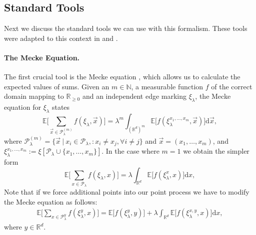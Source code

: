 \documentclass[a4paper,12pt]{scrartcl}
\newcommand{\E}{\mathbb{E}}
\renewcommand{\d}{\mathrm{d}}
\newcommand{\nats}{\mathbb{N}}
\newcommand{\reals}{\mathbb{R}}
\newcommand{\set}[2]{\big\{ #1 \mid #2 \big\}}
\theoremstyle{definition}
\theoremstyle{remark}
\begin{document}

\subsection{Standard Tools}\label{ssec:standard_tools}

Next we discuss the standard tools we can use with this formalism. These tools were adapted to this context in \cite{LastZiescheStationary} and \cite{lace_exp_mean}.

\paragraph{The Mecke Equation.}\label{par:mecke}
The first crucial tool
is the Mecke equation
\cite{lace_exp_mean}, which allows us to calculate the expected values of sums. %
Given an $m\in\nats$, a measurable function $f$ of the correct domain mapping to $\reals_{\geq0}$
and an independent edge marking $\xi_\lambda$, the Mecke equation for $\xi_\lambda$ states
$$
\E\bigg[
  \sum_{\vec x\in\mathcal P_{\lambda}^{(m)}}
f(\xi_\lambda, \vec x)\bigg]
=
\lambda^m \int_{(\reals^d)^m}
\E\bigg[
f(\xi_{\lambda}^{x_1,\dots, x_m}, \vec x)\bigg]
\d\vec x,
$$
where $\mathcal P_\lambda^{(m)}=\{\vec x\ |\ x_i\in\mathcal P_\lambda, :x_i\neq x_j,\forall i\neq j\}$ and $\vec x=(x_1,\dots,x_m)$,
and $\xi_\lambda^{x_1,\ldots,x_m}
:= \xi [ \mathcal P_\lambda \cup \{x_1,\ldots,x_m\}]$.
In the case where $m=1$ we obtain the simpler form
$$
\E\bigg[
  \sum_{ x\in\mathcal P_{\lambda}}
f(\xi_{\lambda}, x)\bigg]
=
\lambda\int_{\reals^d}
\E\bigg[
f(\xi_{\lambda}^{x}, x)\bigg]
\d x,
$$
Note that if we force additional points into our point process we have to modify the Mecke equation as follows:
\begin{align*}
  \E\bigg[
    \sum_{ x\in\mathcal P_{\lambda}^y}
  f(\xi_{\lambda}^y, x)\bigg]
  =
  \E\bigg[
    f(\xi_{\lambda}^{y}, y)
  \bigg]
  +
  \lambda \int_{\mathbb R^d} \E\bigg[
    f(\xi_{\lambda}^{x,y}, x)
  \bigg]
  \d x
  ,
\end{align*}
where $y\in\reals^d$.
\end{document}
